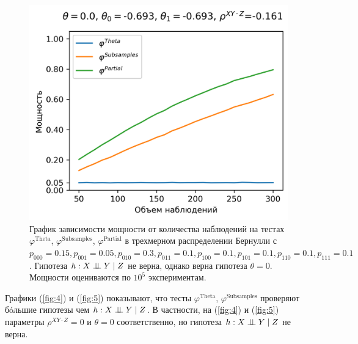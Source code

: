 \begin{figure}[H]
    \centering
    \includegraphics[scale=0.6]{images/graph5.png}
    \caption{График зависимости мощности от количества наблюдений
    на тестах $\varphi^{\text{Theta}}$, $\varphi^{\text{Subsamples}}$, $\varphi^{\text{Partial}}$
    в трехмерном распределении Бернулли с $p_{000}=0.15, p_{001}=0.05, 
    p_{010}=0.3, p_{011}=0.1,
    p_{100}=0.1, p_{101}=0.1, p_{110}=0.1, p_{111}=0.1$. 
    Гипотеза $h: X \perp\!\!\!\perp Y \mid Z$ не верна, однако верна гипотеза $\theta=0$.
    Мощности оцениваются по $10^5$ экспериментам.} \label{fig:5}
\end{figure}

Графики (\autoref{fig:4}) и (\autoref{fig:5}) показывают, что тесты 
$\varphi^{\text{Theta}}$, $\varphi^{\text{Subsamples}}$
проверяют бóльшие гипотезы чем $h: X \perp\!\!\!\perp Y \mid Z$.
В частности, на (\autoref{fig:4}) и (\autoref{fig:5})
параметры $\rho^{XY\cdot Z}=0$ и $\theta=0$ соответственно, но гипотеза
$h: X \perp\!\!\!\perp Y \mid Z$ не верна.

